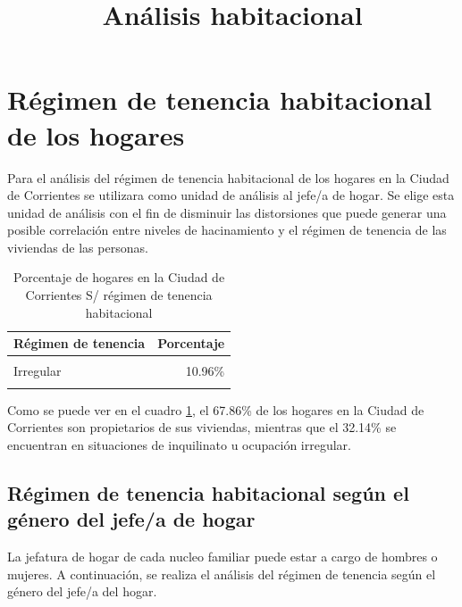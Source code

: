 \documentclass[
]{article}
\title{Análisis habitacional}
\author{}
\date{}
\begin{document}
\hypertarget{ruxe9gimen-de-tenencia-habitacional-de-los-hogares}{%
\section{Régimen de tenencia habitacional de los
hogares}\label{ruxe9gimen-de-tenencia-habitacional-de-los-hogares}}

Para el análisis del régimen de tenencia habitacional de los hogares en
la Ciudad de Corrientes se utilizara como unidad de análisis al jefe/a de
hogar. Se elige esta unidad de análisis con el fin de disminuir las distorsiones que puede generar una posible correlación entre niveles de
hacinamiento y el régimen de tenencia de las viviendas de las personas.

\begin{table}[!h]

\caption{\label{tab:unnamed-chunk-7}Porcentaje de hogares en la Ciudad de Corrientes S/ régimen de tenencia habitacional}
\centering
\begin{tabular}[t]{lr}
\toprule
Régimen de tenencia & Porcentaje\\
\midrule
\cellcolor{gray!6}{Inquilino} & \cellcolor{gray!6}{21.18\%}\\
Irregular & 10.96\%\\
\cellcolor{gray!6}{Propietario} & \cellcolor{gray!6}{67.86\%}\\
\bottomrule
\end{tabular}
\end{table}

Como se puede ver en el cuadro \ref{tab:unnamed-chunk-7}, el 67.86\% de los hogares en la Ciudad
de Corrientes son propietarios de sus viviendas, mientras que el 32.14\%
se encuentran en situaciones de inquilinato u ocupación irregular.

\hypertarget{ruxe9gimen-de-tenencia-habitacional-seguxfan-el-guxe9nero-del-jefea-de-hogar}{%
\subsection{Régimen de tenencia habitacional según el género del jefe/a
de
hogar}\label{ruxe9gimen-de-tenencia-habitacional-seguxfan-el-guxe9nero-del-jefea-de-hogar}}

La jefatura de hogar de cada nucleo familiar puede estar a cargo de
hombres o mujeres. A continuación, se realiza el análisis del régimen de
tenencia según el género del jefe/a del hogar.
\end{document}

